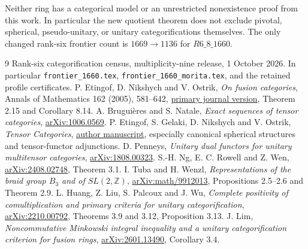 \documentclass[10pt]{article}
\begin{document}
Neither ring has a categorical model or an unrestricted nonexistence proof from this work. In particular the new quotient theorem does not exclude pivotal, spherical, pseudo-unitary, or unitary categorifications themselves. The only changed rank-six frontier count is $1669\longrightarrow1136$ for $R6\_8\_1660$.

\begin{thebibliography}{9}
 Rank-six categorification census, multiplicity-nine release, 1 October 2026. In particular \texttt{frontier\_1660.tex}, \texttt{frontier\_1660\_morita.tex}, and the retained profile certificates.
 P. Etingof, D. Nikshych and V. Ostrik, \emph{On fusion categories}, Annals of Mathematics 162 (2005), 581--642, \href{https://annals.math.princeton.edu/2005/162-2/p01}{primary journal version}, Theorem 2.15 and Corollary 8.14.
 A. Brugui\`eres and S. Natale, \emph{Exact sequences of tensor categories}, \href{https://arxiv.org/abs/1006.0569}{arXiv:1006.0569}.
 P. Etingof, S. Gelaki, D. Nikshych and V. Ostrik, \emph{Tensor Categories}, \href{https://math.mit.edu/~etingof/egnobookfinal.pdf}{author manuscript}, especially canonical spherical structures and tensor-functor adjunctions.
 D. Penneys, \emph{Unitary dual functors for unitary multitensor categories}, \href{https://arxiv.org/abs/1808.00323}{arXiv:1808.00323}.
 S.-H. Ng, E. C. Rowell and Z. Wen, \href{https://arxiv.org/abs/2408.02748}{arXiv:2408.02748}, Theorem 3.1.
 I. Tuba and H. Wenzl, \emph{Representations of the braid group $B_3$ and of $SL(2,\mathbb Z)$}, \href{https://arxiv.org/abs/math/9912013}{arXiv:math/9912013}, Propositions 2.5--2.6 and Theorem 2.9.
 L. Huang, Z. Liu, S. Palcoux and J. Wu, \emph{Complete positivity of comultiplication and primary criteria for unitary categorification}, \href{https://arxiv.org/abs/2210.00792}{arXiv:2210.00792}, Theorems 3.9 and 3.12, Proposition 3.13.
 J. Lim, \emph{Noncommutative Minkowski integral inequality and a unitary categorification criterion for fusion rings}, \href{https://arxiv.org/abs/2601.13490}{arXiv:2601.13490}, Corollary 3.4.
\end{thebibliography}
\end{document}
